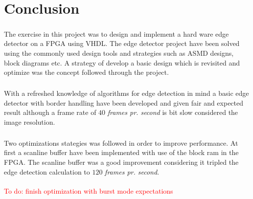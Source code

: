 \chapter{Conclusion}
\paragraph*{ }
The exercise in this project was to design and implement a hard ware edge detector on a FPGA using VHDL. The edge detector project have been solved using the commonly used design tools and strategies such as ASMD designs, block diagrams etc. A strategy of develop a basic design which is revisited and optimize was the concept followed through the project.
\paragraph*{ }
With a refreshed knowledge of algorithms for edge detection in mind a basic edge detector with border handling have been developed and given fair and expected result although a frame rate of $40$ \textit{frames pr. second} is bit slow considered the image resolution.
\paragraph*{ }
Two optimizations stategies was followed in order to improve performance. At first a scanline buffer have been implemented with use of the block ram in the FPGA. The scanline buffer was a good improvement considering it tripled the edge detection calculation to $120$ \textit{frames pr. second}. \\
\\
\textcolor{red}{To do: finish optimization with burst mode expectations}  

\newpage